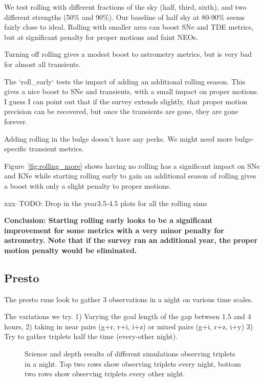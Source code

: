 We test rolling with different fractions of the sky (half, third, sixth), and two different strengths (50\% and 90\%). 
Our baseline of half sky at 80-90\% seems fairly close to ideal. Rolling with smaller area can boost SNe and TDE metrics, but at significant penalty for proper motions and faint NEOs.

Turning off rolling gives a modest boost to astrometry metrics, but is very bad for almost all transients. 

The `roll\_early` tests the impact of adding an additional rolling season. This gives a nice boost to SNe and transients, with a small impact on proper motions. I guess I can point out that if the survey extends slightly, that proper motion precision can be recovered, but once the transients are gone, they are gone forever.

Adding rolling in the bulge doesn't have any perks. We might need more bulge-specific transient metrics.


Figure~\ref{fig:rolling_more} shows having no rolling has a significant impact on SNe and KNe while starting rolling early to gain an additional season of rolling gives a boost with only a slight penalty to proper motions. 

xxx--TODO:  Drop in the year3.5-4.5 plots for all the rolling sims


{\bf Conclusion: Starting rolling early looks to be a significant improvement for some metrics with a very minor penalty for astrometry. Note that if the survey ran an additional year, the proper motion penalty would be eliminated. }


\subsection{Presto}

The presto runs look to gather 3 observations in a night on various time scales.

The variations we try. 1) Varying the goal length of the gap between 1.5 and 4 hours, 2) taking in near pairs (g+r, r+i, i+z) or mixed pairs (g+i, r+z, i+y) 3) Try to gather triplets half the time (every-other night).

\begin{figure}

\caption{ Science and depth results of different simulations observing triplets in a night. Top two rows show observing triplets every night, bottom two rows show observing triplets every other night. \label{fig:presto}}
\end{figure}


